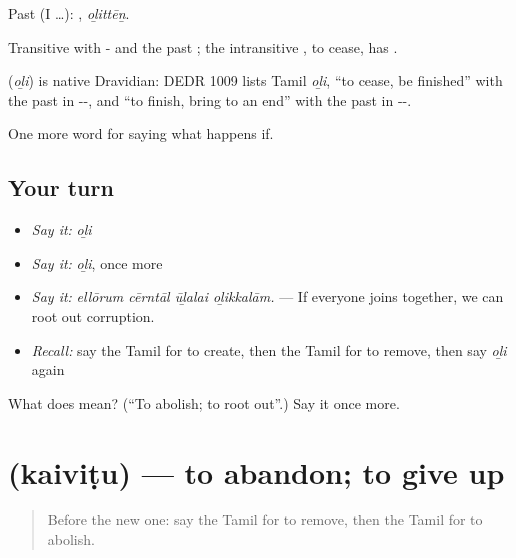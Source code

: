 Past (I …): , \emph{oḻittēṉ}.

Transitive with - and the past ; the intransitive , to cease, has .

\begin{cousinweb}
\textbf{} (\emph{oḻi}) is native Dravidian: DEDR 1009 lists Tamil \emph{oḻi}, \textquotedblleft{}to cease, be finished\textquotedblright{} with the past in --, and \textquotedblleft{}to finish, bring to an end\textquotedblright{} with the past in --.
\end{cousinweb}

\begin{grammarlens}[title={What you've built}]
One more word for saying what happens if.
\end{grammarlens}

\subsection*{Your turn}
\begin{itemize}
\raggedright
  \item \emph{Say it:} \emph{oḻi}
  \item \emph{Say it:} \emph{oḻi}, once more
  \item \emph{Say it:} \emph{ellōrum cērntāl ūḻalai oḻikkalām.} — If everyone joins together, we can root out corruption.
  \item \emph{Recall:} say the Tamil for to create, then the Tamil for to remove, then say \emph{oḻi} again
\end{itemize}

\begin{tcolorbox}[breakable,colback=teal!4,colframe=teal!35!black,title={Before you move on}]
What does  mean? (\textquotedblleft{}To abolish; to root out\textquotedblright{}.) Say it once more.
\end{tcolorbox}
\section[\texorpdfstring{\ta{கைவிடு} (kaiviṭu)}{கைவிடு (kaiviṭu)}]{ (kaiviṭu) — to abandon; to give up}

\label{lesson:TA-C395-kaivitu}



\begin{quote}
Before the new one: say the Tamil for to remove, then the Tamil for to abolish.
\end{quote}

